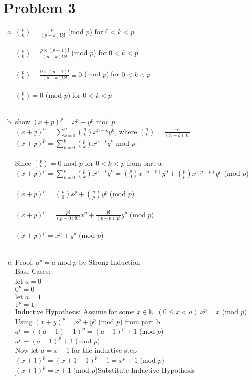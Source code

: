 \documentclass[11pt,letterpaper]{article}
\begin{document}
\section*{Problem 3}
\begin{enumerate}[(a)]
\item
${p\choose k}= \frac{p!}{(p-k)!k!}$ (mod $p$) for $0<k<p$\\\\
${p\choose k}= \frac{p\times(p-1)!}{(p-k)!k!}$ (mod $p$) for $0<k<p$\\\\
${p\choose k}= \frac{0\times(p-1)!}{(p-k)!k!} \equiv 0$ (mod $p$) for $0<k<p$\\\\
${p\choose k}= 0$ (mod $p$) for $0<k<p$\\\\
\item
show $(x+p)^p = x^p + y^p$ mod $p$\\
$(x+y)^n = \sum\limits_{k=0}^n {n\choose k}x^{n-k}y^k $, where ${n\choose k}= \frac{n!}{(n-k)!k!}$\\
$(x+p)^p = \sum\limits_{k=0}^p {p\choose k}x^{p-k}y^k$ mod $p$\\\\
Since ${p\choose k} = 0$ mod $p$ for $0<k<p$ from part a\\

$(x+p)^p = \sum\limits_{k=0}^p {p\choose k}x^{p-k}y^k = {p\choose 0} x^{(p-0)}y^0 + {p\choose p} x^{(p-p)}y^p$  (mod $p$)\\\\
$(x+p)^p = {p\choose 0} x^{p} + {p\choose p} y^p$  (mod $p$)\\\\
$(x+p)^p = \frac{p!}{(p-0)!0!} x^{p} + \frac{p!}{(p-p)!p!} y^p$  (mod $p$)\\\\
$(x+p)^p = x^{p} + y^p$  (mod $p$)\\\\
\item
Proof: $a^p = a$ mod $p$ by Strong Induction\\
Base Cases:\\
let $a=0$\\
$0^p = 0$\\
let $a=1$\\
$1^p = 1$\\
Inductive Hypothesis: Assume for some $x\in\mathbb{N} ~~(0\leq x<a)~x^p =x$ (mod $p$)\\
Using $(x+y)^p = x^p +y^p$ (mod $p$) from part b\\
$a^p = ((a-1)+ 1)^p = (a-1)^p + 1$ (mod $p$)\\
$a^p = (a-1)^p + 1$ (mod $p$)\\
Now let $a=x+1$ for the inductive step\\
$(x+1)^p = (x+1-1)^p + 1 = x^p + 1$ (mod $p$)\\
$(x+1)^p = x + 1$ (mod $p$)\hfill Substitute Inductive Hypothesis\\
\hfill$\square$
\end{enumerate}
\end{document}
